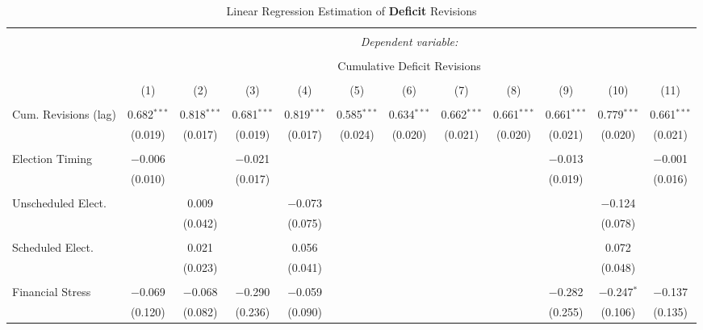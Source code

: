 
\begin{table}[!htbp] \centering 
  \caption{Linear Regression Estimation of \textbf{Deficit} Revisions} 
  \label{deficit_results} 
\tiny 
\begin{tabular}{@{\extracolsep{5pt}}lccccccccccc} 
\\[-1.8ex]\hline 
\hline \\[-1.8ex] 
 & \multicolumn{11}{c}{\textit{Dependent variable:}} \\ 
\cline{2-12} 
\\[-1.8ex] & \multicolumn{11}{c}{Cumulative Deficit Revisions} \\ 
\\[-1.8ex] & (1) & (2) & (3) & (4) & (5) & (6) & (7) & (8) & (9) & (10) & (11)\\ 
\hline \\[-1.8ex] 
 Cum. Revisions (lag) & 0.682$^{***}$ & 0.818$^{***}$ & 0.681$^{***}$ & 0.819$^{***}$ & 0.585$^{***}$ & 0.634$^{***}$ & 0.662$^{***}$ & 0.661$^{***}$ & 0.661$^{***}$ & 0.779$^{***}$ & 0.661$^{***}$ \\ 
  & (0.019) & (0.017) & (0.019) & (0.017) & (0.024) & (0.020) & (0.021) & (0.020) & (0.021) & (0.020) & (0.021) \\ 
  & & & & & & & & & & & \\ 
 Election Timing & $-$0.006 &  & $-$0.021 &  &  &  &  &  & $-$0.013 &  & $-$0.001 \\ 
  & (0.010) &  & (0.017) &  &  &  &  &  & (0.019) &  & (0.016) \\ 
  & & & & & & & & & & & \\ 
 Unscheduled Elect. &  & 0.009 &  & $-$0.073 &  &  &  &  &  & $-$0.124 &  \\ 
  &  & (0.042) &  & (0.075) &  &  &  &  &  & (0.078) &  \\ 
  & & & & & & & & & & & \\ 
 Scheduled Elect. &  & 0.021 &  & 0.056 &  &  &  &  &  & 0.072 &  \\ 
  &  & (0.023) &  & (0.041) &  &  &  &  &  & (0.048) &  \\ 
  & & & & & & & & & & & \\ 
 Financial Stress & $-$0.069 & $-$0.068 & $-$0.290 & $-$0.059 &  &  &  &  & $-$0.282 & $-$0.247$^{*}$ & $-$0.137 \\ 
  & (0.120) & (0.082) & (0.236) & (0.090) &  &  &  &  & (0.255) & (0.106) & (0.135) \\ 

\end{tabular}
\end{table}
